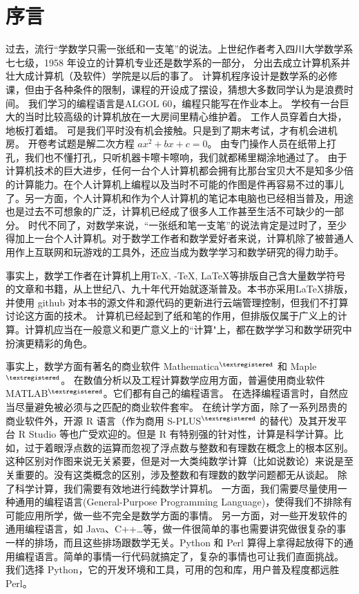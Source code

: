 %
\chapter*{序\quad 言}

\setcounter{page}{1}
\thispagestyle{empty}

过去，流行“学数学只需一张纸和一支笔”的说法。上世纪作者考入四川大学数学系七七级，1958 年设立的计算机专业还是数学系的一部分，
分出去成立计算机系并壮大成计算机（及软件）学院是以后的事了。
计算机程序设计是数学系的必修课，但由于各种条件的限制，课程的开设成了摆设，猜想大多数同学认为是浪费时间。
我们学习的编程语言是ALGOL 60，编程只能写在作业本上。
学校有一台巨大的当时比较高级的计算机放在一大房间里精心维护着。
工作人员穿着白大掛，地板打着蜡。
可是我们平时没有机会接触。只是到了期末考试，才有机会进机房。
开卷考试题是解二次方程 $ax^2+bx+c = 0$。
由专门操作人员在纸带上打孔，我们也不懂打孔，只听机器卡嚓卡嚓响，我们就都稀里糊涂地通过了。
由于计算机技术的巨大进步，任何一台个人计算机都会拥有比那台宝贝大不是知多少倍的计算能力。在个人计算机上编程以及当时不可能的作图是件再容易不过的事儿了。另一方面，个人计算机和作为个人计算机的笔记本电脑也已经相当普及，用途也是过去不可想象的广泛，计算机已经成了很多人工作甚至生活不可缺少的一部分。
时代不同了，对数学来说，“一张纸和笔一支笔”的说法肯定是过时了，至少得加上一台个人计算机。对于数学工作者和数学爱好者来说，计算机除了被普通人用作上互联网和玩游戏的工具外，还应当成为数学学习和数学研究的得力助手。

事实上，数学工作者在计算机上用\TeX, \AmS-\TeX, \LaTeX 等排版自己含大量数学符号的文章和书籍，从上世纪八、九十年代开始就逐渐普及。本书亦采用\LaTeX 排版， 并使用 github 对本书的源文件和源代码的更新进行云端管理控制，但我们不打算讨论这方面的技术。
计算机已经起到了纸和笔的作用，但排版仅属于广义上的计算。计算机应当在一般意义和更广意义上的“计算"上，都在数学学习和数学研究中扮演更精彩的角色。

事实上，数学方面有著名的商业软件 Mathematica${}^{\textregistered}$ 和 Maple${}^{\textregistered}$。
在数值分析以及工程计算数学应用方面，普遍使用商业软件 MATLAB${}^{\textregistered}$。它们都有自己的编程语言。
在选择编程语言时，自然应当尽量避免被必须与之匹配的商业软件套牢。
在统计学方面，除了一系列昂贵的商业软件外，开源 R 语言（作为商用 S-PLUS${}^{\textregistered}$ 的替代）及其开发平台 R Studio 等也广受欢迎的。但是 R 有特别强的针对性，计算是科学计算。比如，过于着眼浮点数的运算而忽视了浮点数与整数和有理数在概念上的根本区别。这种区别对作图来说无关紧要，但是对一大类纯数学计算（比如说数论）来说是至关重要的。没有这类概念的区别，涉及整数和有理数的数学问题都无从谈起。
除了科学计算，我们需要有效地进行纯数学计算机。
一方面，我们需要尽量使用一种通用的编程语言(General-Purpose Programming Language)，使得我们不排除有可能应用所学，做一些不完全是数学方面的事情。
另一方面，对一些开发软件的通用编程语言，如 Java、C++…等，做一件很简单的事也需要讲究做很复杂的事一样的排场，而且这些排场跟数学无关。Python 和 Perl 算得上拿得起放得下的通用编程语言。简单的事情一行代码就搞定了，复杂的事情也可让我们直面挑战。
我们选择 Python，它的开发环境和工具，可用的包和库，用户普及程度都远胜Perl。

